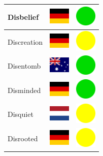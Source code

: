 \documentclass[12pt, a4paper, twoside]{report}
\begin{document}
\begin{center}
\begin{longtable}{|p{5cm}|p{2cm}|p{2cm}|}
 Disbelief                                                  & \includegraphics[width=1cm]{../img/flags/de} &   \includegraphics[width=1cm]{../likes/y} \\ \hline
 Discreation                                                & \includegraphics[width=1cm]{../img/flags/de} &   \includegraphics[width=1cm]{../likes/m} \\ \hline
 Disentomb                                                  & \includegraphics[width=1cm]{../img/flags/au} &   \includegraphics[width=1cm]{../likes/y} \\ \hline
 Disminded                                                  & \includegraphics[width=1cm]{../img/flags/de} &   \includegraphics[width=1cm]{../likes/y} \\ \hline
 Disquiet                                                   & \includegraphics[width=1cm]{../img/flags/nl} &   \includegraphics[width=1cm]{../likes/m} \\ \hline
 Disrooted                                                  & \includegraphics[width=1cm]{../img/flags/de} &   \includegraphics[width=1cm]{../likes/m} \\ \hline

\end{longtable}
\end{center}
\end{document}
